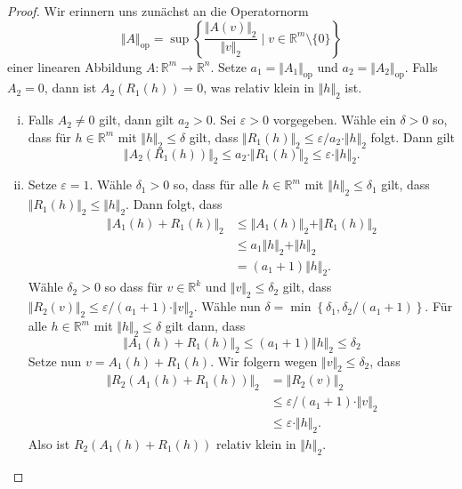 \documentclass[../main.tex]{subfiles}
\begin{document}
\begin{proof}
  Wir erinnern uns zunächst an die Operatornorm
  \[
    \Vert A \Vert_{\text{op}} =
    \sup \left\{\frac{\Vert A(v) \Vert_2}{\Vert v \Vert_2}
    \mid v \in \mathbb{R}^m \setminus \{0\} \right\}
  \]
  einer linearen Abbildung $A \colon \mathbb{R}^m \to \mathbb{R}^n$.
  Setze $a_1 = \Vert A_1 \Vert_{\text{op}}$ und
  $a_2 = \Vert A_2 \Vert_{\text{op}}$.
  Falls $A_2 = 0$, dann ist $A_2(R_1(h)) = 0$, was
  relativ klein in $\Vert h \Vert_2$ ist.
  \begin{enumerate}[(i)]
    \item
      Falls $A_2 \neq 0$ gilt, dann gilt $a_2 > 0$.
      Sei $\varepsilon > 0$ vorgegeben. Wähle ein
      $\delta > 0$ so, dass
      für $h \in \mathbb{R}^m$ mit $\Vert h \Vert_2 \leq \delta$ gilt,
      dass $\Vert R_1(h)\Vert_2 \leq \varepsilon / a_2
      \cdot \Vert h \Vert_2$ folgt.
      Dann gilt
      \[
        \Vert A_2(R_1(h)) \Vert_2 \leq a_2 \cdot \Vert R_1(h) \Vert_2
        \leq \varepsilon \cdot \Vert h \Vert_2.
      \]
    \item
      Setze $\varepsilon = 1$.%
      Wähle $\delta_1 > 0$ so, dass für alle
      $h \in \mathbb{R}^m$ mit $\Vert h \Vert_2 \leq \delta_1$
      gilt, dass $\Vert R_1(h) \Vert_2 \leq \Vert h \Vert_2$.
      Dann folgt, dass
      \begin{align*}
        \Vert A_1(h) + R_1(h) \Vert_2
        &\leq \Vert A_1(h) \Vert_2 + \Vert R_1(h) \Vert_2  \\
        &\leq a_1 \Vert h \Vert_2 + \Vert h \Vert_2 \\
        &= (a_1 + 1) \Vert h \Vert_2.
      \end{align*}
      Wähle $\delta_2 > 0$ so dass für
      $v \in \mathbb{R}^k$
      und $\Vert v \Vert_2 \leq \delta_2$ gilt,
      dass
      $\Vert R_2(v) \Vert_2 \leq \varepsilon/(a_1 + 1) \cdot \Vert v \Vert_2$.
      Wähle nun $\delta = \min \left\{\delta_1,
      \delta_2 / (a_1 + 1) \right\}$.
      Für alle $h \in \mathbb{R}^m$ mit
      $\Vert h \Vert_2 \leq \delta$ gilt dann, dass
      \[
        \Vert A_1(h) + R_1(h) \Vert_2
         \leq (a_1 + 1) \Vert h \Vert_2 \leq \delta_2
      \]
      Setze nun $v = A_1(h) + R_1(h)$.
      Wir folgern wegen $\Vert v \Vert_2 \leq \delta_2$, dass
      \begin{align*}
        \Vert R_2(A_1(h) + R_1(h)) \Vert_2
        & = \Vert R_2(v) \Vert_2  \\
        &\leq \varepsilon / (a_1 + 1) \cdot \Vert v \Vert_2 \\
        &\leq \varepsilon \cdot \Vert h \Vert_2.
      \end{align*}
      Also ist $R_2(A_1(h) + R_1(h))$ relativ klein
      in $\Vert h \Vert_2$. \qedhere
  \end{enumerate}
\end{proof}
\end{document}
